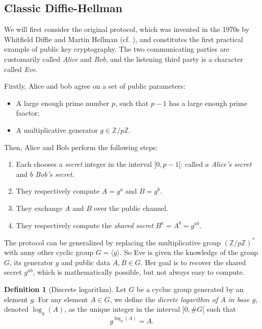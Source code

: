 \documentclass{article}
\theoremstyle{theorem}
\theoremstyle{definition}
\newtheorem{definition}{Definition}
\begin{document}
\subsection{Classic Diffie-Hellman}

We will first consider the original protocol, which was invented in the 1970s by Whitfield Diffie and Martin Hellman (cf. \cite{DiffieHellman}), and constitutes the first practical example of public key cryptography. The two communicating parties are customarily called \textit{Alice} and \textit{Bob}, and the listening third party is a character called \textit{Eve}. 

Firstly, Alice and bob agree on a set of public parameters:
	\begin{itemize}
		\item A large enough prime number $p$, such that $p - 1$ has a large enough prime faactor;
		
		\item A multiplicative generator $g \in \mathbb{Z}/p\mathbb{Z}$.
		
	\end{itemize}
Then, Alice and Bob perform the following steps:
	
	\begin{enumerate}
		\item Each chooses a \textit{secret} integer in the interval $]0, p - 1[$: called $a$ \textit{Alice's secret} and $b$ \textit{Bob's secret}.
		
		\item They respectively compute $A = g^a$ and $B = g^b$.
		
		\item They exchange $A$ and $B$ over the public channel.
		
		\item They respectively compute the \textit{shared secret} $B^a = A^b = g^{ab}$.
	\end{enumerate}

The protocol can be generalized by replacing the multiplicative group $(\mathbb{Z}/p\mathbb{Z})^{\ast}$ with anny other cyclic group $G = \langle g \rangle$. So Eve is given the knowledge of the group $G$, its generator $g$ and public data $A, B \in G$. Her goal is to recover the shared secret $g^{ab}$, which is mathematically possible, but not always easy to compute.

\begin{definition}[Discrete logarithm]
	Let $G$ be a cycluc group generated by an element $g$. For any element $A \in G$, we define the \textit{dicrete logarithm of $A$ in base $g$}, denoted $\log_g(A)$, as the unique integer in the interval $[0, \#G[$ such that
		\[ g^{\log_g(A)} = A. \] 
\end{definition}
\end{document}
